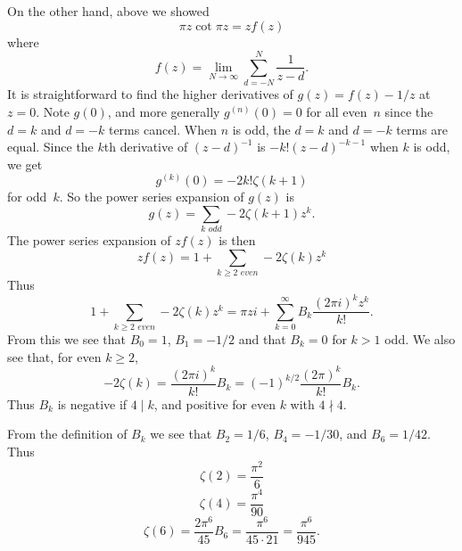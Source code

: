 \documentclass {amsart}
\theoremstyle{plain}
\theoremstyle{definition}
\theoremstyle{remark}
\begin{document}
On the other hand, above we showed
$$
 \pi z \cot \pi z = z f(z)
$$
where
$$
f (z)  = \lim_{N \to \infty} \sum_{d=-N}^{N} \frac{1}{z - d}.
$$
It is straightforward to find the higher derivatives of $g(z) = f(z) - 1/z$ at $z = 0$.
Note $g(0)$, and more generally $g^{(n)} (0) = 0$ for all even~$n$ since the $d=k$ and
$d = -k$ terms cancel. When $n$ is odd, the $d=k$ and
$d = -k$ terms are equal. Since the $k$th derivative of $(z-d)^{-1}$ is $-k! (z-d)^{-k-1}$ when
$k$ is odd, we get
$$
g^{(k)} (0)= - 2 k! \zeta (k+1)
$$
for odd~$k$. So the power series expansion of $g(z)$ is
$$
g(z) = \sum_{\textit{$k$ odd}} -2 \zeta(k+1) z^k.
$$
The power series expansion of $z f(z)$ is then
$$
z f(z) = 1 + \sum_{\textit{$k\ge 2$ even}} - 2 \zeta(k) z^k
$$
Thus
$$
1 + \sum_{\textit{$k\ge 2$ even}} - 2 \zeta(k) z^k = 
\pi z i  + \sum_{k = 0}^\infty B_k \frac{(2 \pi i)^k z^k}{k!}.
$$
From this we see that $B_0 = 1$, $B_1 = -1/2$ and that $B_k = 0$ for $k>1$ odd.
We also see that, for even $k \ge 2$,
$$
-2 \zeta(k) = \frac{(2 \pi i)^k}{k!} B_k = (-1)^{k/2} \frac{(2 \pi)^k}{k!} B_k.
$$
Thus $B_k$ is negative if $4 \mid k$, and positive for even $k$ with $4 \nmid 4$.

From the definition of $B_k$ we see that $B_2 = 1/6$, $B_4 = - 1/30$,
and $B_6 = 1/42$.
Thus
$$
\zeta (2) = \frac{\pi^2}{6}
$$
$$
\zeta (4)  =  \frac{\pi^4}{90}
$$
$$
\zeta (6) = \frac{2 \pi^6}{45} B_6 = \frac{\pi^6}{45\cdot 21} = \frac{\pi^6}{945}.
$$
\end{document}
